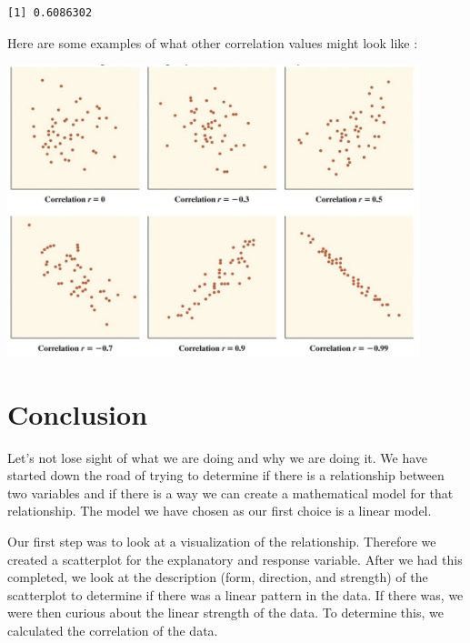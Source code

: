 \documentclass[
  letterpaper,
  DIV=11,
  numbers=noendperiod]{scrreprt}
\newenvironment{Shaded}{\begin{snugshade}}{\end{snugshade}}
\newcommand{\CommentTok}[1]{\textcolor[rgb]{0.37,0.37,0.37}{#1}}
\newcommand{\FunctionTok}[1]{\textcolor[rgb]{0.28,0.35,0.67}{#1}}
\newcommand{\NormalTok}[1]{\textcolor[rgb]{0.00,0.23,0.31}{#1}}
\newcommand{\OtherTok}[1]{\textcolor[rgb]{0.00,0.23,0.31}{#1}}
\newcommand{\SpecialCharTok}[1]{\textcolor[rgb]{0.37,0.37,0.37}{#1}}
\begin{document}
\begin{Shaded}
\end{Shaded}

\begin{verbatim}
[1] 0.6086302
\end{verbatim}

Here are some examples of what other correlation values might look like
:

\includegraphics[width=0.9\textwidth,height=\textheight]{./images/SC_8.jpg}

\section*{Conclusion}\label{conclusion-5}


Let's not lose sight of what we are doing and why we are doing it. We
have started down the road of trying to determine if there is a
relationship between two variables and if there is a way we can create a
mathematical model for that relationship. The model we have chosen as
our first choice is a linear model.

Our first step was to look at a visualization of the relationship.
Therefore we created a scatterplot for the explanatory and response
variable. After we had this completed, we look at the description (form,
direction, and strength) of the scatterplot to determine if there was a
linear pattern in the data. If there was, we were then curious about the
linear strength of the data. To determine this, we calculated the
correlation of the data.
\end{document}
